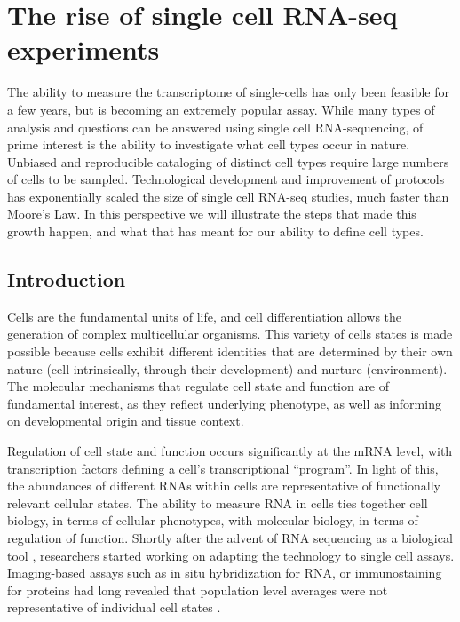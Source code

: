 
\chapter{The rise of single cell RNA-seq experiments} \label{ch:intro}

\graphicspath{{Chapter1/Figs/}}

The ability to measure the transcriptome of single-cells has only been feasible for a few years, but is becoming an extremely popular assay. While many types of analysis and questions can be answered using single cell RNA-sequencing, of prime interest is the ability to investigate what cell types occur in nature. Unbiased and reproducible cataloging of distinct cell types require large numbers of cells to be sampled. Technological development and improvement of protocols has exponentially scaled the size of single cell RNA-seq studies, much faster than Moore’s Law. In this perspective we will illustrate the steps that made this growth happen, and what that has meant for our ability to define cell types.

\section{Introduction}

Cells are the fundamental units of life, and cell differentiation allows the generation of complex multicellular organisms. This variety of cells states is made possible because cells exhibit different identities that are determined by their own nature (cell-intrinsically, through their development) and nurture (environment). The molecular mechanisms that regulate cell state and function are of fundamental interest, as they reflect underlying phenotype, as well as informing on developmental origin and tissue context.

Regulation of cell state and function occurs significantly at the mRNA level, with transcription factors defining a cell’s transcriptional “program”. In light of this, the abundances of different RNAs within cells are representative of functionally relevant cellular states. The ability to measure RNA in cells ties together cell biology, in terms of cellular phenotypes, with molecular biology, in terms of regulation of function. Shortly after the advent of RNA sequencing as a biological tool \cite{Mortazavi2008-rq}, researchers started working on adapting the technology to single cell assays. Imaging-based assays such as in situ hybridization for RNA, or immunostaining for proteins had long revealed that population level averages were not representative of individual cell states \cite{Raj2008-wj}.

